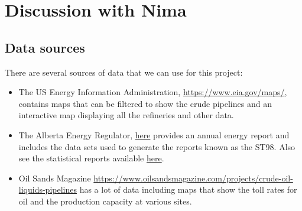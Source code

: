 \documentclass[11pt, letterpaper,nounbold]{article}
\begin{document}
\section{Discussion with Nima}
\subsection{Data sources}
There are several sources of data that we can use for this project:
\begin{itemize}
	\item The US Energy Information Administration, \url{https://www.eia.gov/maps/}, contains maps that can be filtered to show the crude pipelines and an interactive map displaying all the refineries and other data.
	\item The Alberta Energy Regulator, \href{https://www.aer.ca/providing-information/data-and-reports/statistical-reports/st98/statistics-and-data.html}{here} provides an annual energy report and includes the data sets used to generate the reports known as the ST98. Also see the statistical reports available \href{https://www.aer.ca/providing-information/data-and-reports/statistical-reports.html}{here}.
	\item Oil Sands Magazine \url{https://www.oilsandsmagazine.com/projects/crude-oil-liquids-pipelines} has a lot of data including maps that show the toll rates for oil and the production capacity at various sites.
\end{itemize}
\end{document}
